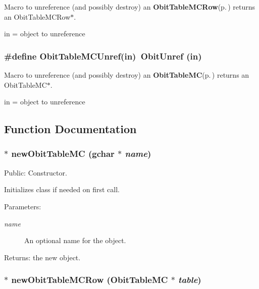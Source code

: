 Macro to unreference (and possibly destroy) an {\bf Obit\-Table\-MCRow}{\rm (p.\,\pageref{structObitTableMCRow})} returns an Obit\-Table\-MCRow$\ast$. 

in = object to unreference 
\subsubsection{\setlength{\rightskip}{0pt plus 5cm}\#define Obit\-Table\-MCUnref(in)\ Obit\-Unref (in)}\label{ObitTableMC_8h_a1}


Macro to unreference (and possibly destroy) an {\bf Obit\-Table\-MC}{\rm (p.\,\pageref{structObitTableMC})} returns an Obit\-Table\-MC$\ast$. 

in = object to unreference 

\subsection{Function Documentation}
\subsubsection{$\ast$ new\-Obit\-Table\-MC (gchar $\ast$ {\em name})}\label{ObitTableMC_8h_a11}


Public: Constructor. 

Initializes class if needed on first call. \begin{Desc}
\item[Parameters:]
\begin{description}
\item[{\em name}]An optional name for the object. \end{description}
\end{Desc}
\begin{Desc}
\item[Returns:]the new object. \end{Desc}
\subsubsection{$\ast$ new\-Obit\-Table\-MCRow ({\bf Obit\-Table\-MC} $\ast$ {\em table})}\label{ObitTableMC_8h_a8}


